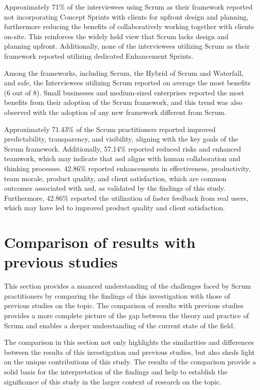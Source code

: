 Approximately 71\% of the interviewees using Scrum as their \gls{framework} reported not incorporating Concept Sprints with \glspl{client} for upfront design and planning, furthermore reducing the benefits of collaboratively working together with \glspl{client} on-site. This reinforces the widely held view that Scrum lacks design and planning upfront. Additionally, none of the interviewees utilizing Scrum as their \gls{framework} reported utilizing dedicated Enhancement Sprints.

Among the \glspl{framework}, including Scrum, the Hybrid of Scrum and Waterfall, and \ac{safe}, the Interviewees utilizing Scrum reported on average the most benefits (6 out of 8). Small businesses and medium-sized enterprises reported the most benefits from their \gls{adoption} of the Scrum \gls{framework}, and this trend was also observed with the \gls{adoption} of any new \gls{framework} different from Scrum. 

Approximately 71.43\% of the Scrum practitioners reported improved predictability, transparency, and visibility, aligning with the key goals of the Scrum \gls{framework}. Additionally, 57.14\% reported reduced risks and enhanced teamwork, which may indicate that \ac{asd} aligns with human collaboration and thinking processes. 42.86\% reported enhancements in effectiveness, productivity, team morale, product quality, and \gls{client} satisfaction, which are common outcomes associated with \ac{asd}, as validated by the findings of this study. Furthermore, 42.86\% reported the utilization of faster feedback from real users, which may have led to improved product quality and \gls{client} satisfaction.

\section{Comparison of results with previous studies}\label{sec:Comparisonofresultswithpreviousstudies}
This section provides a nuanced understanding of the challenges faced by Scrum practitioners by comparing the findings of this investigation with those of previous studies on the topic. The comparison of results with previous studies provides a more complete picture of the gap between the theory and practice of Scrum and enables a deeper understanding of the current state of the field.

The comparison in this section not only highlights the similarities and differences between the results of this investigation and previous studies, but also sheds light on the unique contributions of this study. The results of the comparison provide a solid basis for the interpretation of the findings and help to establish the significance of this study in the larger context of research on the topic.

